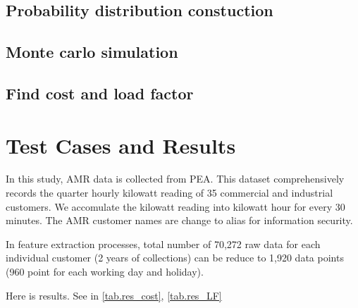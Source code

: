 \documentclass[conference]{IEEEtran}
\begin{document}
\subsection{Probability distribution constuction}

\subsection{Monte carlo simulation}


\subsection{Find cost and load factor}

\section{Test Cases and Results}
In this study, AMR data is collected from PEA. This dataset comprehensively records the quarter hourly kilowatt reading of 35 commercial and industrial customers. We accomulate the kilowatt reading into kilowatt hour for every 30 minutes. The AMR customer names are change to alias for information security.


In feature extraction processes, total number of 70,272 raw data for each individual customer (2 years of collections) can be reduce to 1,920 data points (960 point for each working day and holiday).

Here is results. See in \ref{tab.res_cost}, \ref{tab.res_LF}
\end{document}
